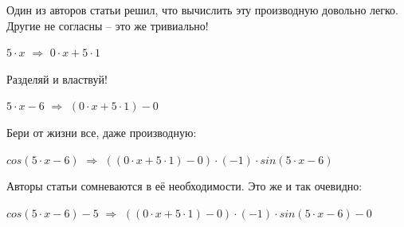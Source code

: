 Один из авторов статьи решил, что вычислить эту производную довольно легко. Другие не согласны -- это же тривиально!

$5 \cdot x$ $\Rightarrow$ $0 \cdot x + 5 \cdot 1$

Разделяй и властвуй!

$5 \cdot x - 6$ $\Rightarrow$ $(0 \cdot x + 5 \cdot 1) - 0$

Бери от жизни все, даже производную:

$ cos (5 \cdot x - 6)$ $\Rightarrow$ $((0 \cdot x + 5 \cdot 1) - 0) \cdot (-1) \cdot  sin (5 \cdot x - 6)$

Авторы статьи сомневаются в её необходимости. Это же и так очевидно:

$ cos (5 \cdot x - 6) - 5$ $\Rightarrow$ $((0 \cdot x + 5 \cdot 1) - 0) \cdot (-1) \cdot  sin (5 \cdot x - 6) - 0$

